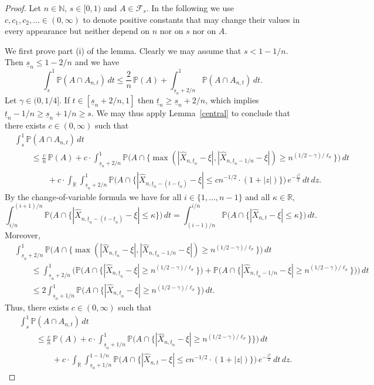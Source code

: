 \documentclass[11pt]{amsart}
\newcommand{\R}{{\mathbb R}}
\newcommand{\N}{{\mathbb N}}
\newcommand{\PP}{{\mathbb P}}
\newcommand{\usn}{\underline {s}_n}
\newcommand{\utn}{\underline {t}_n}
\newcommand{\F}{{\mathcal F}}
\theoremstyle{plain}
\theoremstyle{definition}
\begin{document}
\begin{proof}
Let $n\in\N$, $s\in [0,1)$ and $A\in\F_s$.
In the following we use $c, c_1,c_2,\dots \in (0,\infty)$ to denote positive constants that may change their values in every appearance but  neither depend on $n$ nor on $s$ nor on $A$.


We first prove part (i) of the lemma.
Clearly we may assume that $s<1-1/n$. Then $\usn\le 1-2/n$ and we have
\begin{equation}\label{key00}
 \int_{s}^1\PP(A \cap A_{n,t})\, dt \le \frac{2}{n}\, \PP(A) +  \int_{\usn + 2/n}^1\PP(A \cap A_{n,t})\, dt.
\end{equation}
Let $\gamma\in (0, 1/4]$.
 If $t\in [\usn+2/n,1]$ then $\utn \ge \usn+2/n$, which implies $\utn-1/n \ge \usn+1/n \ge s$.
We may thus apply Lemma~\ref{central} to conclude
 that
there exists $c\in(0, \infty)$ such that
\begin{align*}
& \int_{s}^1 \PP(A\cap A_{n,t})\, dt\\
& \qquad \le
\frac{c}{n}\, \PP(A) + c\cdot\int_{\usn+2/n}^1  \PP\bigl(A\cap\{\max(|\widehat X_{n,\utn}-\xi|,|\widehat X_{n,\utn-1/n}-\xi|)\geq n^{(1/2-\gamma)/\ell_\sigma}\}\bigr)\, dt \\
& \qquad\qquad +
c\cdot \int_{\R} \int_{\usn+2/n}^1 \PP\bigl(A \cap \bigl\{|\widehat X_{n,\utn-(t-\utn)}-\xi| \le c n^{-1/2}\cdot (1+|z|)\bigr\}\bigr)\, e^{-\frac{z^2}{2}}\, dt\, dz.
\end{align*}
By the change-of-variable formula we have for all $i\in\{1, \ldots, n-1\}$ and all $\kappa\in \R$,
\[
\int_{i/n}^{(i+1)/n} \PP\bigl(A \cap \bigl\{|\widehat X_{n,\utn-(t-\utn)}-\xi| \le\kappa \bigr\}\bigr)\, dt=
\int_{(i-1)/n}^{i/n} \PP\bigl(A \cap \bigl\{|\widehat X_{n,t}-\xi| \le\kappa\bigr\}\bigr)\, dt.
\]
Moreover,
\begin{align*}
& \int_{\usn+2/n}^1  \PP\bigl(A\cap\{\max(|\widehat X_{n,\utn}-\xi|,|\widehat X_{n,\utn-1/n}-\xi|)  \geq n^{(1/2-\gamma)/\ell_\sigma}\}\bigr)\, dt \\
& \qquad\le \int_{\usn+2/n}^1  \bigl( \PP\bigl(A\cap\{|\widehat X_{n,\utn}-\xi|\geq n^{(1/2-\gamma)/\ell_\sigma}\}\bigr) + \PP\bigl(A\cap\{|\widehat X_{n,\utn-1/n}-\xi|\geq n^{(1/2-\gamma)/\ell_\sigma}\}\bigr)\bigr)\, dt \\
& \qquad\le 2\int_{\usn+1/n}^1  \PP\bigl(A\cap\{|\widehat X_{n,\utn}-\xi|\geq n^{(1/2-\gamma)/\ell_\sigma}\}\bigr)\, dt.
\end{align*}
Thus, there exists $c\in(0, \infty)$ such that
\begin{equation}\label{key01}
\begin{aligned}
& \int_{s}^1 \PP(A\cap A_{n,t})\, dt\\
& \qquad \leq \frac{c}{n}\, \PP(A) + c\cdot\int_{\usn+1/n}^1  \PP\bigl(A\cap\{|\widehat X_{n,\utn}-\xi|\geq n^{(1/2-\gamma)/\ell_\sigma}\}\}\bigr)\, dt\\
& \qquad \qquad + c\cdot \int_{\R} \int_{\usn+1/n}^{1-1/n} \PP\bigl(A \cap \bigl\{|\widehat X_{n,t}-\xi| \le c n^{-1/2}\cdot (1+|z|)\bigr\}\bigr)\, e^{-\frac{z^2}{2}}\, dt\, dz.
\end{aligned}
\end{equation}



\end{proof}
\end{document}
